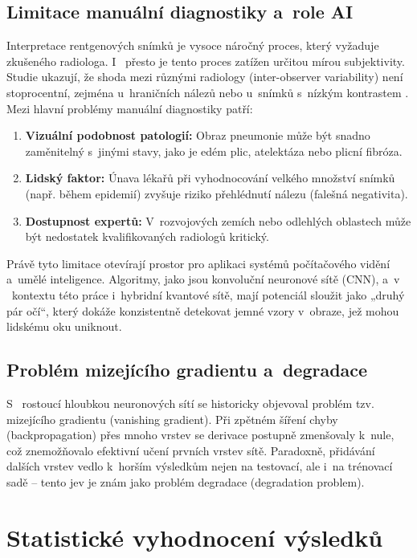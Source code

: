 \documentclass[12pt, a4paper]{report}
\begin{document}
\subsection{Limitace manuální diagnostiky a~role AI}
Interpretace rentgenových snímků je vysoce náročný proces, který vyžaduje zkušeného radiologa.
I ~přesto je tento proces zatížen určitou mírou subjektivity. Studie ukazují, že shoda mezi různými radiology (inter-observer variability) není stoprocentní, zejména u~hraničních nálezů nebo u~snímků s~nízkým kontrastem \cite{radiologist_error_rate}.
Mezi hlavní problémy manuální diagnostiky patří:
\begin{enumerate}
    \item \textbf{Vizuální podobnost patologií:} Obraz pneumonie může být snadno zaměnitelný s~jinými stavy, jako je edém plic, atelektáza nebo plicní fibróza.
    \item \textbf{Lidský faktor:} Únava lékařů při vyhodnocování velkého množství snímků (např. během epidemií) zvyšuje riziko přehlédnutí nálezu (falešná negativita).
    \item \textbf{Dostupnost expertů:} V~rozvojových zemích nebo odlehlých oblastech může být nedostatek kvalifikovaných radiologů kritický.
\end{enumerate}

Právě tyto limitace otevírají prostor pro aplikaci systémů počítačového vidění a~umělé inteligence.
Algoritmy, jako jsou konvoluční neuronové sítě (CNN), a~v ~kontextu této práce i~hybridní kvantové sítě, mají potenciál sloužit jako „druhý pár očí“, který dokáže konzistentně detekovat jemné vzory v~obraze, jež mohou lidskému oku uniknout.

\subsection{Problém mizejícího gradientu a~degradace}
S ~rostoucí hloubkou neuronových sítí se historicky objevoval problém tzv. mizejícího gradientu (vanishing gradient).
Při zpětném šíření chyby (backpropagation) přes mnoho vrstev se derivace postupně zmenšovaly k~nule, což znemožňovalo efektivní učení prvních vrstev sítě.
Paradoxně, přidávání dalších vrstev vedlo k~horším výsledkům nejen na testovací, ale i~na trénovací sadě – tento jev je znám jako problém degradace (degradation problem).

\section{Statistické vyhodnocení výsledků} \label{sec:statistika}
\end{document}
